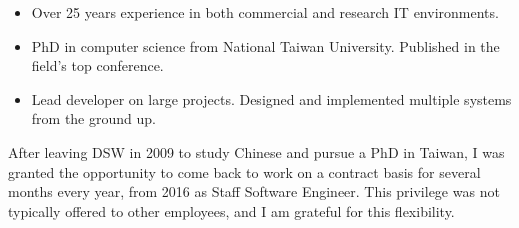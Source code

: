 \documentclass[10pt,a4paper]{../altacv}
\begin{document}

\begin{fullwidth}
\makecvheader

\begin{itemize}
\item Over 25 years experience in both commercial and research IT environments.
\item PhD in computer science from National Taiwan University. Published in the field’s top conference. 
\item Lead developer on large projects. Designed and implemented multiple systems from the ground up.
\end{itemize}

\end{fullwidth}

\small


\medskip


After leaving DSW in 2009 to study Chinese and pursue a PhD in Taiwan, I was granted the opportunity to come back to work on a contract basis for several months every year, from 2016 as Staff Software Engineer. This privilege was not typically offered to other employees, and I am grateful for this flexibility.

\medskip
\end{document}
